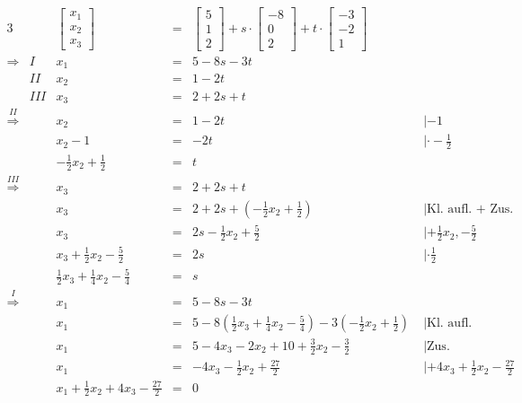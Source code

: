 \documentclass[10pt,a4paper,oneside,ngerman,numbers=noenddot]{scrartcl}
\begin{document}
\subsection{} %
\begin{alignat*}{3}
&& \begin{bmatrix}
x_{1} \\
x_{2} \\
x_{3}
\end{bmatrix} &=& 
\begin{bmatrix}
5 \\
1 \\
2
\end{bmatrix} + s \cdot
\begin{bmatrix}
-8 \\
0 \\
2
\end{bmatrix} + t \cdot
\begin{bmatrix}
-3 \\
-2 \\
1
\end{bmatrix} \\
\Rightarrow & I & x_{1} &=& 5 - 8s - 3t \\
& II & x_{2} &=& 1 - 2t \\
& III & x_{3} &=& 2 + 2s + t \\
\overset{II}{\Rightarrow} && x_{2} &=& 1 - 2t & \;| -1 \\
&& x_{2} - 1 &=& -2t & \;| \cdot -\frac{1}{2} \\
&& -\frac{1}{2}x_{2} + \frac{1}{2} &=& t & \\
\overset{III}{\Rightarrow} && x_{3} &=& 2 + 2s + t & \\
&& x_{3} &=& 2 + 2s + (-\frac{1}{2}x_{2} + \frac{1}{2}) & \;| \text{Kl. aufl. + Zus.} \\
&& x_{3} &=& 2s - \frac{1}{2}x_{2} + \frac{5}{2} & \;| + \frac{1}{2}x_{2}, - \frac{5}{2} \\
&& x_{3} + \frac{1}{2}x_{2} - \frac{5}{2} &=& 2s & \;| \cdot \frac{1}{2} \\
&& \frac{1}{2}x_{3} + \frac{1}{4}x_{2} - \frac{5}{4} &=& s & \\
\overset{I}{\Rightarrow} && x_{1} &=& 5 - 8s - 3t & \\
&& x_{1} &=& 5 - 8(\frac{1}{2}x_{3} + \frac{1}{4}x_{2} - \frac{5}{4}) - 3(-\frac{1}{2}x_{2} + \frac{1}{2}) & \;| \text{Kl. aufl.} \\
&& x_{1} &=& 5 - 4x_{3} - 2x_{2} + 10 + \frac{3}{2}x_{2} - \frac{3}{2} & \;| \text{Zus.} \\
&& x_{1} &=& - 4x_{3} - \frac{1}{2}x_{2} + \frac{27}{2} & \;| +4x_{3} + \frac{1}{2}x_{2} - \frac{27}{2} \\
&& x_{1} + \frac{1}{2}x_{2} + 4x_{3} - \frac{27}{2} &=& 0 &
\end{alignat*}
\end{document}
